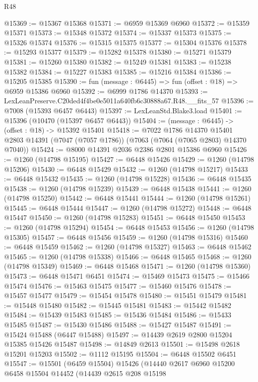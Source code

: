 \begin{lexlean}{R48}
\begin{coremodule}
@15369 := @15367 @15368
@15371 := @6959 @15369 @6960
@15372 := @15359 @15371
@15373 := @15348 @15372
@15374 := @15337 @15373
@15375 := @15326 @15374
@15376 := @15315 @15375
@15377 := @15304 @15376
@15378 := @15293 @15377
@15379 := @15282 @15378
@15380 := @15271 @15379
@15381 := @15260 @15380
@15382 := @15249 @15381
@15383 := @15238 @15382
@15384 := @15227 @15383
@15385 := @15216 @15384
@15386 := @15205 @15385
@15390 := fun (message : @6445) => fun (offset : @18) => @6959 @15386 @6960
@15392 := @6999 @1786 @14370
@15393 := LexLeanPreserve.C20ded4f4be0e5011a640fb6c30888a67.R48.__fits_57
@15396 := @7008 (@15393 @6457 @6443)
@15397 := LexLeanStd.Blake3.load
@15401 := @15396 (@10470 (@15397 @6457 @6443))
@15404 := (message : @6445) -> (offset : @18) -> @15392 @15401
@15418 := @7022
    @1786
    @14370
    @15401
    @2803
    @14391
    (@7047 (@7057 @1786))
    (@7063 (@7064 (@7065 @2803) @14370 @7040))
@15424 := @8000 @14391 @2036 @2386 @2801 @15386 @6960
@15426 := @1260 (@14798 @15195)
@15427 := @6448 @15426
@15429 := @1260 (@14798 @15206)
@15430 := @6448 @15429
@15432 := @1260 (@14798 @15217)
@15433 := @6448 @15432
@15435 := @1260 (@14798 @15228)
@15436 := @6448 @15435
@15438 := @1260 (@14798 @15239)
@15439 := @6448 @15438
@15441 := @1260 (@14798 @15250)
@15442 := @6448 @15441
@15444 := @1260 (@14798 @15261)
@15445 := @6448 @15444
@15447 := @1260 (@14798 @15272)
@15448 := @6448 @15447
@15450 := @1260 (@14798 @15283)
@15451 := @6448 @15450
@15453 := @1260 (@14798 @15294)
@15454 := @6448 @15453
@15456 := @1260 (@14798 @15305)
@15457 := @6448 @15456
@15459 := @1260 (@14798 @15316)
@15460 := @6448 @15459
@15462 := @1260 (@14798 @15327)
@15463 := @6448 @15462
@15465 := @1260 (@14798 @15338)
@15466 := @6448 @15465
@15468 := @1260 (@14798 @15349)
@15469 := @6448 @15468
@15471 := @1260 (@14798 @15360)
@15473 := @6448 @15471 @6451
@15474 := @15469 @15473
@15475 := @15466 @15474
@15476 := @15463 @15475
@15477 := @15460 @15476
@15478 := @15457 @15477
@15479 := @15454 @15478
@15480 := @15451 @15479
@15481 := @15448 @15480
@15482 := @15445 @15481
@15483 := @15442 @15482
@15484 := @15439 @15483
@15485 := @15436 @15484
@15486 := @15433 @15485
@15487 := @15430 @15486
@15488 := @15427 @15487
@15491 := @15424 @15488 (@6447 @15488)
@15497 := @14439 @2619 @2800 @15204 @15385 @15426 @15487
@15498 := @14849 @2613
@15501 := @15498 @2618 @15201 @15203
@15502 := @1112 @15195
@15504 := @6448 @15502 @6451
@15547 := @15501
    (@6459 @15504)
    @15426
    (@14440
      @2617
      @6960
      @15200
      @6458
      @15504
      @14452
      (@14439
        @2615
        @208
        @15198

\end{coremodule}
\end{lexlean}
